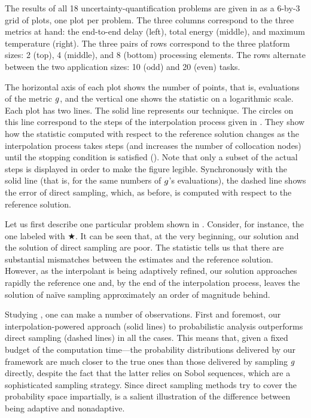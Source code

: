
The results of all 18 uncertainty-quantification problems are given in
 as a 6-by-3 grid of plots, one plot per problem. The three
columns correspond to the three metrics at hand: the end-to-end delay (left),
total energy (middle), and maximum temperature (right). The three pairs of rows
correspond to the three platform sizes: 2 (top), 4 (middle), and 8 (bottom)
processing elements. The rows alternate between the two application sizes: 10
(odd) and 20 (even) tasks.

The horizontal axis of each plot shows the number of points, that is,
evaluations of the metric $g$, and the vertical one shows the  statistic
on a logarithmic scale. Each plot has two lines. The solid line represents our
technique. The circles on this line correspond to the steps of the interpolation
process given in . They show how the  statistic
computed with respect to the reference solution changes as the interpolation
process takes steps (and increases the number of collocation nodes) until the
stopping condition is satisfied (). Note that only a subset of
the actual steps is displayed in order to make the figure legible. Synchronously
with the solid line (that is, for the same numbers of $g$'s evaluations), the
dashed line shows the error of direct sampling, which, as before, is computed
with respect to the reference solution.

Let us first describe one particular problem shown in . Consider,
for instance, the one labeled with $\bigstar$. It can be seen that, at the very
beginning, our solution and the solution of direct sampling are poor. The
 statistic tells us that there are substantial mismatches between the
estimates and the reference solution. However, as the interpolant is being
adaptively refined, our solution approaches rapidly the reference one and, by
the end of the interpolation process, leaves the solution of na\"{i}ve sampling
approximately an order of magnitude behind.

Studying , one can make a number of observations. First and
foremost, our interpolation-powered approach (solid lines) to probabilistic
analysis outperforms direct sampling (dashed lines) in all the cases. This means
that, given a fixed budget of the computation time---the probability
distributions delivered by our framework are much closer to the true ones than
those delivered by sampling $g$ directly, despite the fact that the latter
relies on Sobol sequences, which are a sophisticated sampling strategy. Since
direct sampling methods try to cover the probability space impartially,
 is a salient illustration of the difference between being
adaptive and nonadaptive.


